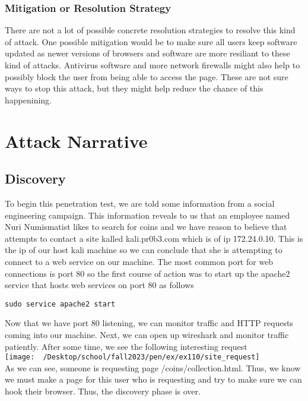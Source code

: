 \documentclass[notitlepage]{article}
\begin{document}
    \subsubsection*{Mitigation or Resolution Strategy}
    There are not a lot of possible concrete resolution strategies to resolve this kind of attack. One possible mitigation would be to make sure all users keep software updated as 
    newer versions of browsers and software are more resiliant to these kind of attacks. Antivirus software and more network firewalls might also help to possibly block the user
    from being able to access the page. These are not sure ways to stop this attack, but they might help reduce the chance of this happenining.



\section{Attack Narrative}

    \subsection{Discovery}
    To begin this penetration test, we are told some information from a social engineering campaign.
    This information reveals to us that an employee named Nuri Numismatist likes to search for coins
    and we have reason to believe that attempts to contact a site kalled kali.pr0b3.com which is of
    ip 172.24.0.10. This is the ip of our host kali machine so we can conclude that she is attempting
    to connect to a web service on our machine. The most common port for web connections is port 80
    so the first course of action was to start up the apache2 service that hosts web services on port
    80 as follows
\begin{verbatim}
sudo service apache2 start
\end{verbatim}
    Now that we have port 80 listening, we can monitor traffic and HTTP requests coming into our machine. Next, we can open
    up wireshark and monitor traffic patiently. After some time, we see the following interesting request\\
\texttt{[image: ~/Desktop/school/fall2023/pen/ex/ex110/site\_request]}\\
    As we can see, someone is requesting page /coins/collection.html. Thus, we know we must make a page
    for this user who is requesting and try to make sure we can hook their browser. Thus, the discovery phase
    is over.
\end{document}
